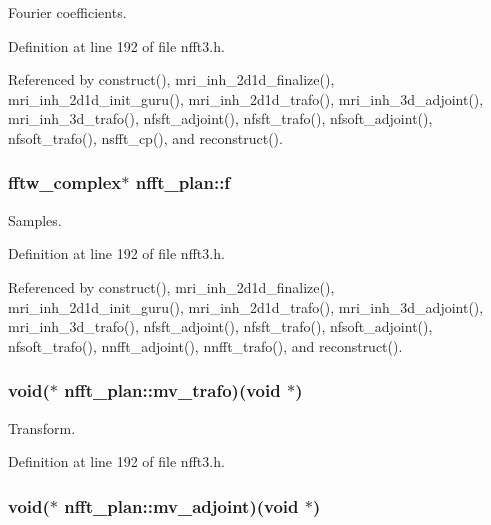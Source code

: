 Fourier coefficients. 



Definition at line 192 of file nfft3.\-h.



Referenced by construct(), mri\-\_\-inh\-\_\-2d1d\-\_\-finalize(), mri\-\_\-inh\-\_\-2d1d\-\_\-init\-\_\-guru(), mri\-\_\-inh\-\_\-2d1d\-\_\-trafo(), mri\-\_\-inh\-\_\-3d\-\_\-adjoint(), mri\-\_\-inh\-\_\-3d\-\_\-trafo(), nfsft\-\_\-adjoint(), nfsft\-\_\-trafo(), nfsoft\-\_\-adjoint(), nfsoft\-\_\-trafo(), nsfft\-\_\-cp(), and reconstruct().

\hypertarget{structnfft__plan_afa27a166f809acf70ae27e5e6f28daa5}{
\subsubsection[{f}]{\setlength{\rightskip}{0pt plus 5cm}fftw\-\_\-complex$\ast$ nfft\-\_\-plan\-::f}}\label{structnfft__plan_afa27a166f809acf70ae27e5e6f28daa5}


Samples. 



Definition at line 192 of file nfft3.\-h.



Referenced by construct(), mri\-\_\-inh\-\_\-2d1d\-\_\-finalize(), mri\-\_\-inh\-\_\-2d1d\-\_\-init\-\_\-guru(), mri\-\_\-inh\-\_\-2d1d\-\_\-trafo(), mri\-\_\-inh\-\_\-3d\-\_\-adjoint(), mri\-\_\-inh\-\_\-3d\-\_\-trafo(), nfsft\-\_\-adjoint(), nfsft\-\_\-trafo(), nfsoft\-\_\-adjoint(), nfsoft\-\_\-trafo(), nnfft\-\_\-adjoint(), nnfft\-\_\-trafo(), and reconstruct().

\hypertarget{structnfft__plan_a9ebd66f2964cca6a02fc50d640df3557}{
\subsubsection[{mv\-\_\-trafo}]{\setlength{\rightskip}{0pt plus 5cm}void($\ast$ nfft\-\_\-plan\-::mv\-\_\-trafo)(void $\ast$)}}\label{structnfft__plan_a9ebd66f2964cca6a02fc50d640df3557}


Transform. 



Definition at line 192 of file nfft3.\-h.

\hypertarget{structnfft__plan_abbe724645c96ef34c3e98d821f6648a3}{
\subsubsection[{mv\-\_\-adjoint}]{\setlength{\rightskip}{0pt plus 5cm}void($\ast$ nfft\-\_\-plan\-::mv\-\_\-adjoint)(void $\ast$)}}\label{structnfft__plan_abbe724645c96ef34c3e98d821f6648a3}


